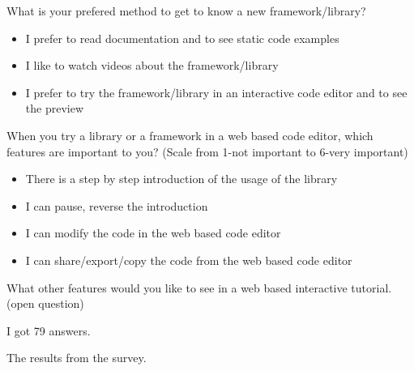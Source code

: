 \documentclass[12pt, a4paper, oneside, openright, medskipamount]{report}
\begin{document}
\noindent What is your prefered method to get to know a new framework/library?
\begin{itemize}[noitemsep]
\item I prefer to read documentation and to see static code examples
\item I like to watch videos about the framework/library
\item I prefer to try the framework/library in an interactive code editor and to see the preview
\end{itemize}

\noindent When you try a library or a framework in a web based code editor, which features are important to you? (Scale from 1-not important to 6-very important)
\begin{itemize}[noitemsep]
\item There is a step by step introduction of the usage of the library
\item I can pause, reverse the introduction
\item I can modify the code in the web based code editor
\item I can share/export/copy the code from the web based code editor
\end{itemize}

What other features would you like to see in a web based interactive tutorial.
(open question)

I got 79 answers.

The results from the survey.
\end{document}
